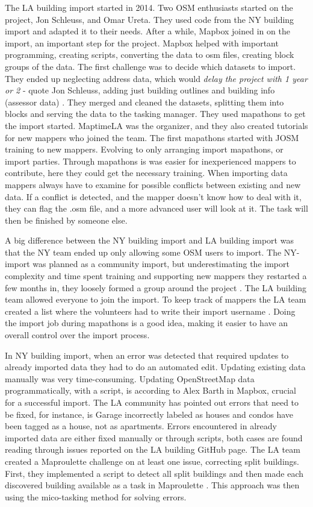 The LA building import started in 2014. Two OSM enthusiasts started on the project, Jon Schleuss, and Omar Ureta. They used code from the NY building import and adapted it to their needs. After a while, Mapbox joined in on the import, an important step for the project. Mapbox helped with important programming, creating scripts, converting the data to osm files, creating block groups of the data. The first challenge was to decide which datasets to import.  They ended up neglecting address data, which would \textit{delay the project with 1 year or 2} - quote Jon Schleuss, adding just building outlines and building info (assessor data) \cite{Schleuss2016}. They merged and cleaned the datasets, splitting them into blocks and serving the data to the tasking manager. They used mapathons to get the import started. MaptimeLA was the organizer, and they also created tutorials for new mappers who joined the team. The first mapathons started with JOSM training to new mappers. Evolving to only arranging import mapathons, or import parties. Through mapathons is was easier for inexperienced mappers to contribute, here they could get the necessary training.  When importing data mappers always have to examine for possible conflicts between existing and new data. If a conflict is detected, and the mapper doesn't know how to deal with it, they can flag the .osm file, and a more advanced user will look at it. The task will then be finished by someone else. 

A big difference between the NY building import and LA building import was that the NY team ended up only allowing some OSM users to import. The NY-import was planned as a community import, but underestimating the import complexity and time spent training and supporting new mappers they restarted a few months in,  they loosely formed a group around the project \cite{Barth2014}. The LA building team allowed everyone to join the import. To keep track of mappers the LA team created a list where the volunteers had to write their import username \cite{Sambale2016s}. Doing the import job during mapathons is a good idea, making it easier to have an overall control over the import process. 

In NY building import, when an error was detected that required updates to already imported data they had to do an automated edit. Updating existing data manually was very time-consuming. Updating OpenStreetMap data programmatically, with a script, is according to Alex Barth in Mapbox, crucial for a successful import.  The LA community has pointed out errors that need to be fixed, for instance, is Garage incorrectly labeled as houses and condos have been tagged as a house, not as apartments. Errors encountered in already imported data are either fixed manually or through scripts, both cases are found reading through issues reported on the LA building GitHub page. The LA team created a Maproulette challenge on at least one issue, correcting split buildings. First, they implemented a script to detect all split buildings and then made each discovered building available as a task in Maproulette \cite{Sambale2016a}. This approach was then using the mico-tasking method for solving errors.  

